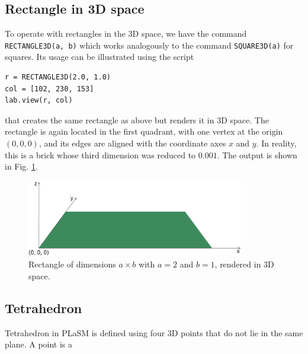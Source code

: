 \subsection{Rectangle in 3D space}

To operate with rectangles in the 3D space, we have the command {\tt RECTANGLE3D(a, b)}
which works analogously to the command {\tt SQUARE3D(a)} for squares. Its usage
can be illustrated using the script \\

\begin{bbox}
\begin{verbatim}
r = RECTANGLE3D(2.0, 1.0)
col = [102, 230, 153]
lab.view(r, col)
\end{verbatim}
\end{bbox}
\vspace{6mm}

\noindent
that creates the same rectangle as above but renders it in 3D space.
The rectangle is again located in the first quadrant, with one vertex 
at the origin $(0, 0, 0)$, and its edges are aligned with the coordinate
axes $x$ and $y$. In reality, this is a brick whose third dimension was
reduced to $0.001$. The output is shown in Fig. \ref{fig:rect-111}.

\begin{figure}[!ht]
\begin{center}
\includegraphics[width=0.85\textwidth]{img/rect-111.png}
\end{center}
\vspace{-4mm}
\caption{Rectangle of dimensions $a \times b$ with $a = 2$ and $b = 1$, rendered in 3D space.}
\label{fig:rect-111}
\end{figure}
\noindent




\subsection{Tetrahedron}

Tetrahedron in PLaSM is defined using four 3D points that do not lie in the same 
plane. A point is a 

